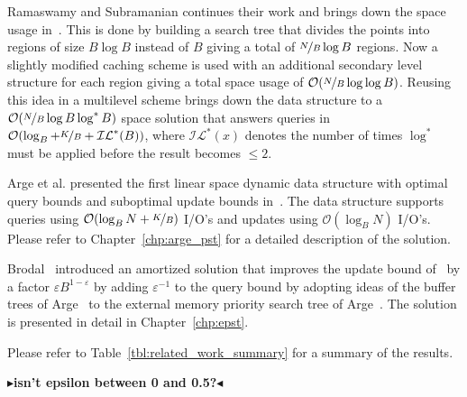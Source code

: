 \documentclass[twoside,11pt,openright]{report}
\def \epsilon {\varepsilon}
\newcommand{\todo}[1]{{\color[rgb]{.5,0,0}\textbf{$\blacktriangleright$#1$\blacktriangleleft$}}}
\begin{document}
Ramaswamy and Subramanian continues their work and brings down the space usage in~\cite{Subramanian:1995:PTN:313651.313769}. This is done by building a search tree that divides the points into regions of size $B \log B$ instead of $B$ giving a total of $\nicefrac{N}{B} \log B$ regions. Now a slightly modified caching scheme is used with an additional secondary level structure for each region giving a total space usage of $\mathcal{O}(\nicefrac{N}{B} \log \log B)$. Reusing this idea in a multilevel scheme brings down the data structure to a $\mathcal{O}(\nicefrac{N}{B} \log B \log^* B)$ space solution that answers queries in $\mathcal{O}(\log_B + \nicefrac{K}{B} + \mathcal{IL}^*(B))$, where $\mathcal{IL^*}(x)$ denotes the number of times $\log^*$ must be applied before the result becomes $\leq 2$.

Arge et al. presented the first linear space dynamic data structure with optimal query bounds and suboptimal update bounds in~\cite{arge_samoladas_vitter_1999}. The data structure supports queries using $\mathcal{O}(\log_B N + \nicefrac{K}{B})$ I/O's and updates using $\mathcal{O}(\log_B N)$ I/O's. Please refer to Chapter~\ref{chp:arge_pst} for a detailed description of the solution.

Brodal~\cite{DBLP:journals/corr/Brodal15} introduced an amortized solution that improves the update bound of~\cite{arge_samoladas_vitter_1999} by a factor $\epsilon B^{1-\epsilon}$ by adding $\epsilon^{-1}$ to the query bound by adopting ideas of the buffer trees of Arge~\cite{Arge:1995:BTN:645930.672850} to the external memory priority search tree of Arge~\cite{arge_samoladas_vitter_1999}. The solution is presented in detail in Chapter~\ref{chp:epst}.

Please refer to Table~\ref{tbl:related_work_summary} for a summary of the results.

\todo{isn't epsilon between 0 and 0.5?}
\end{document}
